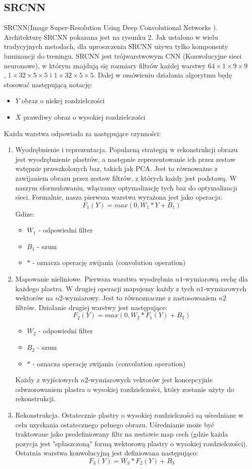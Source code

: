 \documentclass[a4paper,11pt, notitlepage ]{article}
\begin{document}
	 \subsection{SRCNN}
	 SRCNN(Image Super-Resolution Using Deep Convolutional Networks
	 ). Architekturę SRCNN pokazana jest na rysunku 2. Jak ustalono w wielu tradycyjnych metodach, dla uproszczenia SRCNN używa tylko komponenty luminancji do treningu. SRCNN jest trójwarstwowym CNN (Konwolucyjne sieci neuronowe), w którym znajdują się rozmiary filtrów każdej warstwy $64 \times 1 \times 9 \times 9$, $1 \times 32 \times 5 \times 5$ i $1 \times 32 \times 5 \times 5$. Dalej w omówieniu działania algorytmu będę stosować następującą notację:
	 \begin{itemize}
	 	\item $Y$ obraz o niskej rozdzielczości
	 	\item $X$ prawdiwy obraz o wysokiej rozdzielczości  
	 \end{itemize}
	 Każda warstwa odpowiada za następujące czynności:
	 \begin{enumerate}
	 	\item Wyodrębnienie i reprezentacja. Popularną strategią w rekonstrukcji obrazu  jest wyodrębnienie plastrów, a następnie reprezentowanie ich przez zestaw wstępnie przeszkolonych baz, takich jak PCA. Jest to równoważne z zawijaniem obrazu przez zestaw filtrów, z których każdy jest podstawą. W naszym sformułowaniu, włączamy optymalizację tych baz do optymalizacji sieci. Formalnie, nasza pierwsza warstwa wyrażona jest jako operacja:
	 	$$ F_1(Y)=max(0,W_1 * Y+ B_1)$$
	 	Gdize: 
	 	\begin{itemize}
	 		\item$W_1$ - odpowiedni filter
	 		\item $B_1$ - szum
	 		\item $*$ - oznacza operację zwijania (convolution operation) 
	 	\end{itemize}
	 	\item Mapowanie nieliniowe. Pierwsza warstwa wyodrębnia $n1$-wymiarową cechę dla każdego plastra. W drugiej operacji mapujemy każdy z tych $n1$-wymiarowych wektorów na $n2$-wymiarowy. Jest to równoznaczne z zastosowaniem $n2$ filtrów. Działanie drugiej warstwy jest następujące:
	 	$$F_2(Y)= max(0,W_2*F_1(Y)+B_2)$$
	 	\begin{itemize}
	 		\item$W_2$ - odpowiedni filter
	 		\item $B_2$ - szum
	 		\item $*$ - oznacza operację zwijania (convolution operation) 
	 	\end{itemize}
 		Każdy z wyjściowych $n2$-wymiarowych vektorów jest koncepcyjnie odwzorowaniem plastra o wysokiej rozdzielczości, który zostanie użyty do rekonstrukcji.
	 	\item Rekonstrukcja. Ostatecznie  plastry o wysokiej rozdzielczości są  uśredniane w celu uzyskania ostatecznego pełnego obrazu.  Uśrednianie może być traktowane jako predefiniowany filtr na zestawie map cech (gdzie każda pozycja jest "spłaszczoną" formą wektorową plastry o wysokiej rozdzielczości). Ostatnia warstwa konwolucyjną jest definiowana następująco:
	 	$$F_3(Y)=W_3*F_2(Y)+B_3$$
	 \end{enumerate}
\end{document}
